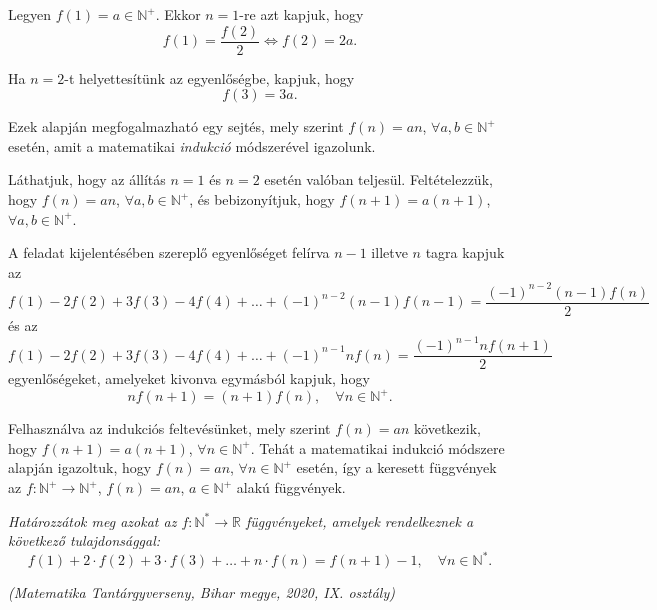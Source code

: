 \begin{solution}
Legyen $f(1)=a\in\mathbb{N}^{+}$. Ekkor $n=1$-re azt kapjuk, hogy
\[
f(1)=\frac{f(2)}{2}\iff f(2)=2a.
\]

Ha $n=2$-t helyettesítünk az egyenlőségbe, kapjuk, hogy 
\[
f(3)=3a.
\]

Ezek alapján megfogalmazható egy sejtés, mely szerint $f(n)=an$,
$\forall a,b\in\mathbb{N}^{+}$ esetén, amit a matematikai \textit{indukció}
módszerével igazolunk.

Láthatjuk, hogy az állítás $n=1$ és $n=2$ esetén valóban teljesül.
Feltételezzük, hogy $f(n)=an$, $\forall a,b\in\mathbb{N}^{+}$, és
bebizonyítjuk, hogy $f(n+1)=a(n+1)$, $\forall a,b\in\mathbb{N}^{+}$.

A feladat kijelentésében szereplő egyenlőséget felírva $n-1$ illetve
$n$ tagra kapjuk az 
\[
f(1)-2f(2)+3f(3)-4f(4)+\dots+(-1)^{n-2}(n-1)f(n-1)=\frac{(-1)^{n-2}(n-1)f(n)}{2}
\]
és az 
\[
f(1)-2f(2)+3f(3)-4f(4)+\dots+(-1)^{n-1}nf(n)=\frac{(-1)^{n-1}nf(n+1)}{2}
\]
egyenlőségeket, amelyeket kivonva egymásból kapjuk, hogy 
\[
nf(n+1)=(n+1)f(n),\quad\forall n\in\mathbb{N}^{+}.
\]

Felhasználva az indukciós feltevésünket, mely szerint $f(n)=an$ következik,
hogy $f(n+1)=a(n+1)$, $\forall n\in\mathbb{N}^{+}$. Tehát a matematikai
indukció módszere alapján igazoltuk, hogy $f(n)=an$, $\forall n\in\mathbb{N}^{+}$
esetén, így a keresett függvények az $f:\mathbb{N}^{+}\to\mathbb{N}^{+}$,
$f(n)=an$, $a\in\mathbb{N}^{+}$ alakú függvények.
\end{solution}
\begin{extraproblem}
\textit{\emph{Határozzátok meg azokat az $f:\mathbb{N}^{*}\rightarrow\mathbb{R}$
függvényeket, amelyek rendelkeznek a következő tulajdonsággal:}}\emph{
\[
f(1)+2\cdot f(2)+3\cdot f(3)+\dots+n\cdot f(n)=f(n+1)-1,\quad\forall n\in\mathbb{N}^{*}.
\]
}

\textit{(Matematika Tantárgyverseny, Bihar megye, 2020, IX. osztály)}
\end{extraproblem}

